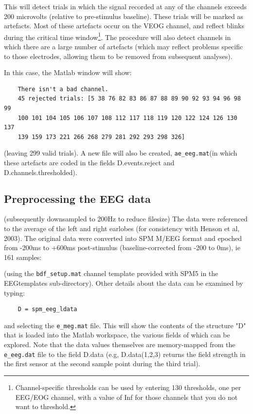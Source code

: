 This will detect trials in which the signal recorded at any of the channels exceeds 200 microvolts (relative to pre-stimulus baseline). These trials will be marked as artefacts. Most of these artefacts occur on the VEOG channel, and reflect blinks during the critical time window\footnote{Channel-specific thresholds can be used by entering 130 thresholds, one per EEG/EOG channel, with a value of Inf for those channels that you do not want to threshold.}. The procedure will also detect channels in which there are a large number of artefacts (which may reflect problems specific to those electrodes, allowing them to be removed from subsequent analyses).

In this case, the Matlab window will show:
\begin{verbatim}
    There isn't a bad channel.
    45 rejected trials: [5 38 76 82 83 86 87 88 89 90 92 93 94 96 98 99
    100 101 104 105 106 107 108 112 117 118 119 120 122 124 126 130 137
    139 159 173 221 266 268 279 281 292 293 298 326]
\end{verbatim}
(leaving 299 valid trials). A new file will also be created, \verb!ae_eeg.mat!(in which these artefacts are coded in the fields D.events.reject and D.channels.thresholded).


\subsection{Preprocessing the EEG data}

(subsequently downsampled to 200Hz to reduce filesize)
The data were referenced to the average of the left and right earlobes (for consistency with Henson et al, 2003). 
The original data were converted into SPM M/EEG format and epoched from -200ms to +600ms post-stimulus (baseline-corrected from -200 to 0ms), ie 161 samples:

(using the \verb!bdf_setup.mat! channel template provided with SPM5 in the EEGtemplates sub-directory).
Other details about the data can be examined by typing:
\begin{verbatim}
    D = spm_eeg_ldata
\end{verbatim}
and selecting the \verb!e_meg.mat! file. This will show the contents of the structure "D" that is loaded into the Matlab workspace, the various fields of which can be explored. Note that the data values themselves are memory-mapped from the \verb!e_eeg.dat! file to the field D.data (e.g, D.data(1,2,3) returns the field strength in the first sensor at the second sample point during the third trial).

